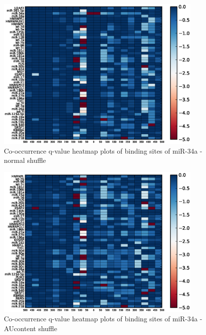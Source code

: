 \begin{figure}
   	\includegraphics[width=0.9\textwidth,clip]{appendix1/figures/miR-34a_normal_expressed_heatmap_qvalues0.eps}
   	\caption{Co-occurrence q-value heatmap plots of binding sites of miR-34a - normal shuffle}
\end{figure}
\clearpage
\begin{figure}
   	\includegraphics[width=0.9\textwidth,clip]{appendix1/figures/miR-34a_AUcontent_expressed_heatmap_qvalues0.eps}
   	\caption{Co-occurrence q-value heatmap plots of binding sites of miR-34a - AUcontent shuffle}
\end{figure}

